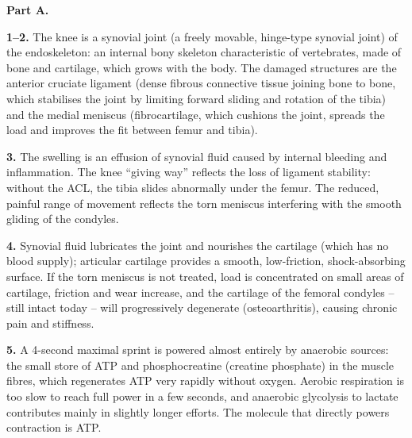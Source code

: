 \documentclass[11pt]{article}
\newcommand{\cle}[1]{{\popxbold\color{popdark}#1}}
\newcounter{popsec}
\newcounter{popsub}
\newcommand{\courssub}[1]{%
  \stepcounter{popsub}%
  \par\vspace{9pt}\noindent{\popxbold\fontsize{11.5}{13}\selectfont\color{popink}{\color{poporange}\thepopsec.\thepopsub}\hspace{6pt}#1}\par\nopagebreak\vspace{4pt}
}
\begin{document}
\courssub{Model answer}

\textbf{Part A.}

\textbf{1--2.} The knee is a \cle{synovial joint} (a freely movable, hinge-type synovial joint) of the \cle{endoskeleton}: an internal bony skeleton characteristic of vertebrates, made of bone and cartilage, which grows with the body. The damaged structures are the anterior cruciate \cle{ligament} (dense fibrous connective tissue joining bone to bone, which stabilises the joint by limiting forward sliding and rotation of the tibia) and the medial \cle{meniscus} (fibrocartilage, which cushions the joint, spreads the load and improves the fit between femur and tibia).

\textbf{3.} The swelling is an effusion of synovial fluid caused by internal bleeding and inflammation. The knee ``giving way'' reflects the loss of ligament stability: without the ACL, the tibia slides abnormally under the femur. The reduced, painful range of movement reflects the torn meniscus interfering with the smooth gliding of the condyles.

\textbf{4.} Synovial fluid lubricates the joint and nourishes the cartilage (which has no blood supply); articular cartilage provides a smooth, low-friction, shock-absorbing surface. If the torn meniscus is not treated, load is concentrated on small areas of cartilage, friction and wear increase, and the cartilage of the femoral condyles -- still intact today -- will progressively degenerate (osteoarthritis), causing chronic pain and stiffness.

\textbf{5.} A 4-second maximal sprint is powered almost entirely by \cle{anaerobic} sources: the small store of ATP and \cle{phosphocreatine} (creatine phosphate) in the muscle fibres, which regenerates ATP very rapidly without oxygen. Aerobic respiration is too slow to reach full power in a few seconds, and anaerobic glycolysis to lactate contributes mainly in slightly longer efforts. The molecule that directly powers contraction is \cle{ATP}.
\end{document}
